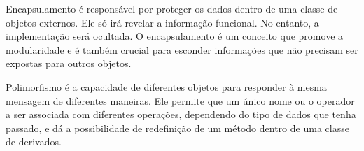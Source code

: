   Encapsulamento é responsável por proteger os dados dentro de uma classe de objetos externos. Ele só irá revelar a informação funcional. No entanto, a implementação será ocultada. O encapsulamento é um conceito que promove a modularidade e é também crucial para esconder informações que não precisam ser expostas para outros objetos.

  Polimorfismo é a capacidade de diferentes objetos para responder à mesma mensagem de diferentes maneiras. Ele permite que um único nome ou o operador a ser associada com diferentes operações, dependendo do tipo de dados que tenha passado, e dá a possibilidade de redefinição de um método dentro de uma classe de derivados.
  \cite{esPratica:2010}
